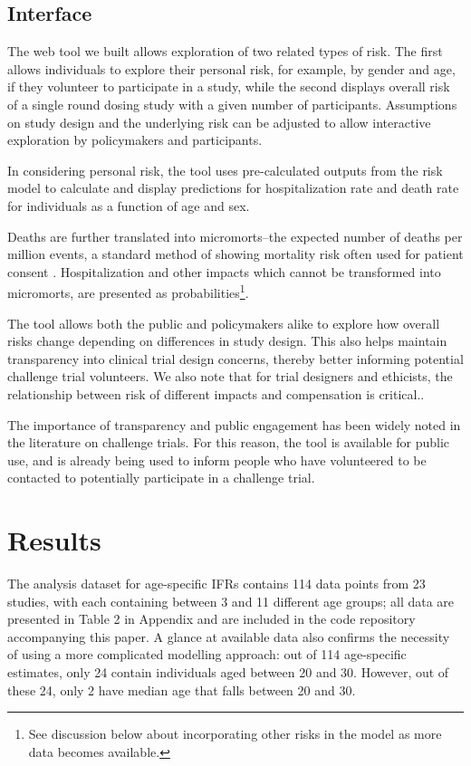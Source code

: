 \documentclass{article}
\begin{document}
\subsection{Interface}

The web tool we built allows exploration of two related types of risk. The first allows individuals to explore their personal risk, for example, by gender and age, if they volunteer to participate in a study, while the second displays overall risk of a single round dosing study with a given number of participants. Assumptions on study design and the underlying risk can be adjusted to allow interactive exploration by policymakers and participants.

In considering personal risk, the tool uses pre-calculated outputs from the risk model to calculate and display predictions for hospitalization rate and death rate for individuals as a function of age and sex. 

Deaths are further translated into micromorts--the expected number of deaths per million events, a standard method of showing mortality risk\cite{howard1980making} often used for patient consent \cite{ahmad2015micromort}. Hospitalization and other impacts which cannot be transformed into micromorts, are presented as probabilities\footnote{See discussion below about incorporating other risks in the model as more data becomes available.}. 

The tool allows both the public and policymakers alike to explore how overall risks change depending on differences in study design. This also helps maintain transparency into clinical trial design concerns, thereby better informing potential challenge trial volunteers. We also note that for trial designers and ethicists, the relationship between risk of different impacts and compensation is critical.\cite{grimwade2020payment,palmer2020, Blumenthal-Barbymedethics-2020-106901}.

The importance of transparency and public engagement has been widely noted in the literature on challenge trials\cite{jamrozik2020covid}. For this reason, the tool is available for public use, and is already being used to inform people who have volunteered to be contacted to potentially participate in a challenge trial\cite{1DSWeb}.

\section{Results}

The analysis dataset for age-specific IFRs contains 114 data points from 23 studies, with each containing between 3 and 11 different age groups; all data are presented in Table 2 in Appendix and are included in the code repository accompanying this paper. A glance at available data also confirms the necessity of using a more complicated modelling approach: out of 114 age-specific estimates, only 24 contain individuals aged between 20 and 30. However, out of these 24, only 2 have median age that falls between 20 and 30.
\end{document}
